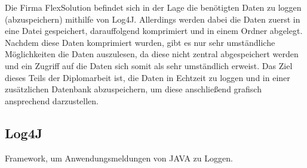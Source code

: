 Die Firma FlexSolution befindet sich in der Lage die benötigten Daten zu loggen (abzuspeichern) mithilfe von Log4J. Allerdings werden dabei die Daten zuerst in eine Datei gespeichert, darauffolgend komprimiert und in einem Ordner abgelegt. Nachdem diese Daten komprimiert wurden, gibt es nur sehr umständliche Möglichkeiten die Daten auszulesen, da diese nicht zentral abgespeichert werden und ein Zugriff auf die Daten sich somit als sehr umständlich erweist. Das Ziel dieses Teils der Diplomarbeit ist, die Daten in Echtzeit zu loggen und in einer zusätzlichen Datenbank abzuspeichern, um diese anschließend grafisch ansprechend darzustellen. 

\subsection{Log4J}
Framework, um Anwendungsmeldungen von JAVA zu Loggen. 